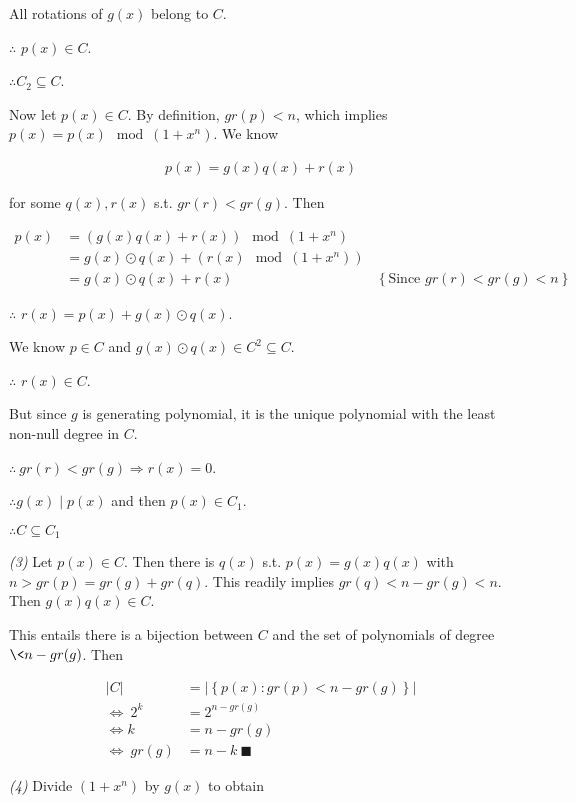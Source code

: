 \documentclass[a4paper]{article}
\begin{document}
All rotations of $g(x)$ belong to $C$. 

$\therefore $ $p(x) \in C$.

$\therefore C_2 \subseteq C$.

Now let $p(x) \in C$. By definition, $gr(p) < n$, which implies $p(x) = p(x)
\mod (1 + x^n)$. We know

\begin{align*}
    p(x) = g(x) q(x) + r(x)
\end{align*}

for some $q(x), r(x)$ s.t. $gr(r) < gr(g)$. Then

\begin{align*}
    p(x) &= \left( g(x) q(x) + r(x) \right)  \mod (1 + x^n)\\ 
         &= g(x) \odot q(x) + \left( r(x) \mod (1 + x^n) \right)  \\ 
         &= g(x) \odot q(x) + r(x) &\left\{ \text{Since $gr(r) < gr(g) < n$} \right\} 
\end{align*}

$\therefore $ $r(x) = p(x) + g(x) \odot q(x)$. 

We know $p \in C$ and $g(x) \odot q(x) \in C^2 \subseteq C$. 

$\therefore $ $r(x) \in C$.

But since $g$ is generating polynomial, it is the unique polynomial with the
least non-null degree in $C$.

$\therefore ~ gr(r) < gr(g) \Rightarrow r(x) = 0$.

$\therefore g(x) \mid p(x)$ and then $p(x) \in C_1$.

$\therefore C \subseteq C_1$

\textit{(3)} Let $p(x) \in C$. Then there is $q(x)$ s.t. $p(x) = g(x) q(x)$
with $n > gr(p) = gr(g) + gr(q)$. This readily implies $gr(q) < n - gr(g) < n$.
Then $g(x) q(x) \in C$.

This entails there is a bijection between $C$ and the set of polynomials of
degree $\< n - gr(g)$. Then 

\begin{align*}
    |C| &= |\left\{ p(x) : gr(p) < n - gr(g) \right\} | \\ 
    \iff ~ 2^k &= 2^{n-gr(g)} \\ 
    \iff k &= n - gr(g) \\ 
    \iff ~ gr(g) &= n - k ~ \blacksquare
\end{align*}

\textit{(4)} Divide $(1 + x^n)$ by $g(x)$ to obtain 
\end{document}
